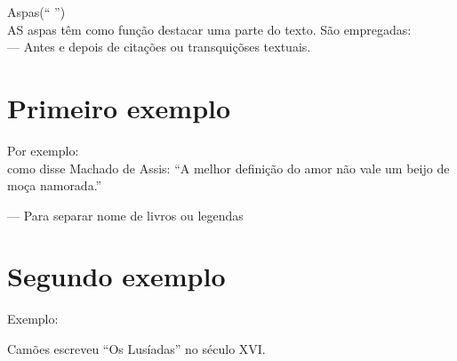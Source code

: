 \documentclass[12pt, article, oneside]{memoir}
\begin{document}
		  	 Aspas(`` '')\\
		  	AS aspas têm como função destacar uma parte do texto. São empregadas:\\
		  	--- Antes e depois de citações ou transquiçõses textuais.
		  	\newpage
		  	\chapter{Primeiro exemplo}
		  	Por exemplo:\\
		  	como disse Machado de Assis: ``A melhor definição do amor não vale um beijo de moça namorada.''
		  	
		  	--- Para separar nome de livros ou legendas\\
		  	\newpage
		  	\chapter{Segundo exemplo}
		  	Exemplo:
		  	
		  	Camões escreveu ``Os Lusíadas'' no século XVI.
		  
		  	
		  	
		   
		   
		
		
		
		
		
		
		
				
	
	
	
\end{document}

